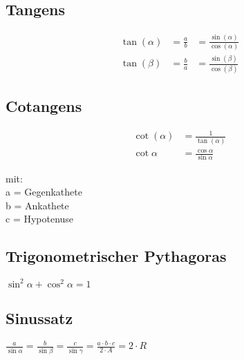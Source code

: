 \begin{sectionbox}
	\subsection{Tangens}
		\begin{emphbox}
			\begin{align*}
			\tan(\alpha) &= \frac{a}{b} &= \frac{\sin(\alpha)}{\cos(\alpha)} \\
			\tan(\beta) &= \frac{b}{a} &= \frac{\sin(\beta)}{\cos(\beta)}
			\end{align*}
		\end{emphbox}
		
	\subsection{Cotangens}
		\begin{emphbox}
			\begin{align*}
			\cot(\alpha) &= \frac{1}{\tan(\alpha)} \\
			\cot \alpha &= \frac{\cos \alpha}{\sin \alpha} 		
			\end{align*}
		\end{emphbox}
	mit:\\
	a = Gegenkathete\\
	b = Ankathete\\
	c = Hypotenuse


	\subsection{Trigonometrischer Pythagoras}
		\begin{emphbox}
			$ \sin ^2 \alpha + \cos ^2 \alpha = 1 $
		\end{emphbox}
		
	\subsection{Sinussatz}
		\begin{emphbox}
			$ \frac{a}{\sin \alpha} = \frac{b}{\sin \beta} = \frac{c}{\sin \gamma} = \frac{a \cdot b \cdot c}{2 \cdot A} = 2 \cdot R$
		\end{emphbox}


\end{sectionbox}
